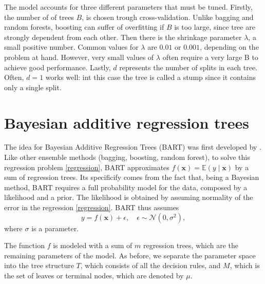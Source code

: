\documentclass[a4paper,11pt]{article}
\begin{document}
The model accounts for three different parameters that must be tuned. Firstly, the number of of trees $B$, is chosen trough cross-validation. Unlike bagging and random forests, boosting can suffer of overfitting if $B$ is too large, since tree are strongly dependent from each other. 
Then there is the shrinkage parameter $\lambda$, a small positive number. Common values for $\lambda$ are $0.01$ or $0.001$, depending on the problem at hand. However, very small values of $\lambda$ often require a very large B to achieve good performance. Lastly, $d$ represents the number of splits in each tree. Often, $d=1$ works well: int this case the tree is called a stump since it contains only a single split.

\section{Bayesian additive regression trees}
\label{bart}

The idea for Bayesian Additive Regression Trees (BART) was first developed by \cite{chipmanBARTBayesianAdditive2010}. Like other ensemble methods (bagging, boosting, random forest), to solve this regression problem \eqref{regression}, BART approximates \( f(\mathbf{x}) = \mathbb{E}(y \mid \mathbf{x}) \) by a sum of regression trees. Its specificify comes from the fact that, being a Bayesian method, BART requires a full probability model for the data, composed by a likelihood and a prior. 
The likelihood is obtained by assuming normality of the error in the regression \eqref{regression}. BART thus assumes 
\begin{equation}
y = f(\mathbf{x}) + \epsilon, \quad \epsilon \sim \mathcal{N}(0, \sigma^2), \label{regression2}
\end{equation}
where \( \sigma \) is a parameter.

The function $f$ is modeled with a sum of $m$ regression trees, which are the remaining parameters of the model. As before, we separate the parameter space into the tree structure $T$, which consists of all the decision rules, and $M$, which is the set of leaves or terminal nodes, which are denoted by $\mu$.
\end{document}
